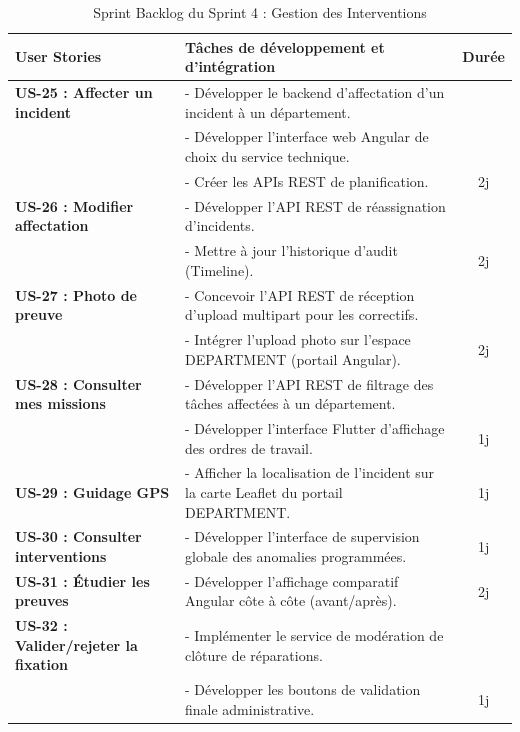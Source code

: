 \begin{table}[H]
    \centering
    \caption{Sprint Backlog du Sprint 4 : Gestion des Interventions}
    \label{tab:backlog_sprint4}
    \vspace{0.2cm}
    \scriptsize
    \begin{tabularx}{\textwidth}{|l|X|c|}
        \hline
        \textbf{User Stories} & \textbf{Tâches de développement et d'intégration} & \textbf{Durée} \\ \hline
        \textbf{US-25 : Affecter un incident} & 
        - Développer le backend d'affectation d'un incident à un département.\\
        & - Développer l'interface web Angular de choix du service technique.\\
        & - Créer les APIs REST de planification. & 2j \\ \hline
        \textbf{US-26 : Modifier affectation} &
        - Développer l'API REST de réassignation d'incidents.\\
        & - Mettre à jour l'historique d'audit (Timeline). & 2j \\ \hline
        \textbf{US-27 : Photo de preuve} &
        - Concevoir l'API REST de réception d'upload multipart pour les correctifs.\\
        & - Intégrer l'upload photo sur l'espace DEPARTMENT (portail Angular). & 2j \\ \hline
        \textbf{US-28 : Consulter mes missions} &
        - Développer l'API REST de filtrage des tâches affectées à un département.\\
        & - Développer l'interface Flutter d'affichage des ordres de travail. & 1j \\ \hline
        \textbf{US-29 : Guidage GPS} &
        - Afficher la localisation de l'incident sur la carte Leaflet du portail DEPARTMENT. & 1j \\ \hline
        \textbf{US-30 : Consulter interventions} &
        - Développer l'interface de supervision globale des anomalies programmées. & 1j \\ \hline
        \textbf{US-31 : Étudier les preuves} &
        - Développer l'affichage comparatif Angular côte à côte (avant/après). & 2j \\ \hline
        \textbf{US-32 : Valider/rejeter la fixation} &
        - Implémenter le service de modération de clôture de réparations.\\
        & - Développer les boutons de validation finale administrative. & 1j \\ \hline

\end{tabularx}
\end{table}
